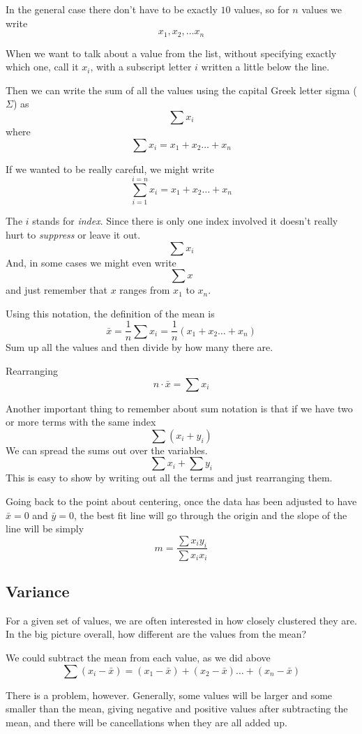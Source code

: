 \documentclass[11pt, oneside]{article}
\begin{document}
In the general case there don't have to be exactly $10$ values, so for $n$ values we write
\[ x_1, x_2, \dots x_n \]

When we want to talk about a value from the list, without specifying exactly which one, call it $x_i$, with a subscript letter $i$ written a little below the line.  

Then we can write the sum of all the values using the capital Greek letter sigma ($\Sigma$) as
\[ \sum x_i  \]
where
\[ \sum x_i = x_1 + x_2 \dots + x_n \]

If we wanted to be really careful, we might write
\[ \sum_{i=1}^{i=n}  x_i = x_1 + x_2 \dots + x_n \]

The $i$ stands for \emph{index}.  Since there is only one index involved it doesn't really hurt to \emph{suppress} or leave it out.
\[ \sum x_i  \]
And, in some cases we might even write
\[ \sum x  \]
and just remember that $x$ ranges from $x_1$ to $x_n$.

Using this notation, the definition of the mean is
\[ \bar{x} = \frac{1}{n} \sum x_i  = \frac{1}{n}  (x_1 + x_2 \dots + x_n) \]
Sum up all the values and then divide by how many there are.

Rearranging
\[ n \cdot \bar{x} = \sum x_i  \]

Another important thing to remember about sum notation is that if we have two or more terms with the same index
\[ \sum (x_i + y_i) \]
We can spread the sums out over the variables.
\[ \sum x_i + \sum y_i \]
This is easy to show by writing out all the terms and just rearranging them.

Going back to the point about centering, once the data has been adjusted to have $\bar{x} = 0$ and $\bar{y} = 0$, the best fit line will go through the origin and the slope of the line will be simply
\[ m = \frac{\sum x_i y_i}{\sum x_i x_i} \]

\subsection*{Variance}

For a given set of values, we are often interested in how closely clustered they are.  In the big picture overall, how different are the values from the mean?

We could subtract the mean from each value, as we did above
\[ \sum (x_i - \bar{x}) = (x_1 - \bar{x}) + (x_2 - \bar{x}) \dots + (x_n - \bar{x})  \]

There is a problem, however.  Generally, some values will be  larger and some smaller than the mean, giving negative and positive values after subtracting the mean, and there will be cancellations when they are all added up.
\end{document}
